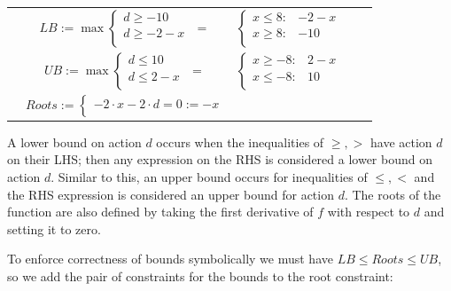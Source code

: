 \documentclass[letterpaper]{article}
\begin{document}
{\footnotesize
\begin{center}
\begin{tabular}{r c c c l}
&
\hspace{-9mm} $LB:= \max
  \begin{cases}
d \geq -10 \\ 
d \geq -2 -x\\ 
  \end{cases}$
$=$
&
\hspace{-4mm}
$  \begin{cases}
x \leq 8: & -2 -x \\ 
x \geq 8: &-10\\ 
  \end{cases}$
&
\hspace{-4mm} 
\\
&
\hspace{-4mm}
$UB:= \max
  \begin{cases}
d \leq 10 \\ 
d \leq 2 -x\\ 
  \end{cases}$
$=$
&
\hspace{-4mm}
$  \begin{cases}
x \geq -8: & 2 -x \\ 
x \leq -8: &10\\ 
  \end{cases}$
&
\hspace{-4mm} 
\\
&
\hspace{-4mm}
$Roots:= 
  \begin{cases}
-2\cdot x -2 \cdot d=0  := -x \\ 

  \end{cases}$
\end{tabular}
\end{center}
}

A lower bound on action $d$ occurs when the inequalities of $\geq ,>$ have action $d$ on their LHS; then any expression on the RHS is considered a lower bound on action $d$. Similar to this, an upper bound occurs for inequalities of $\leq , <$ and the RHS expression is considered an upper bound for action $d$. 
The roots of the function are also defined by taking the first derivative of $f$ with respect to $d$ and setting it to zero.

To enforce correctness of bounds symbolically we must have $LB \leq Roots \leq UB$, so we add the pair of constraints for the bounds to the root constraint:
\end{document}

